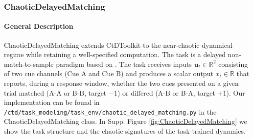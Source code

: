\documentclass{article}
\begin{document}
\clearpage
\subsubsection{ChaoticDelayedMatching \label{appendix:TT-TaskEnvs-Chaotic}}
\paragraph{General Description}
ChaoticDelayedMatching extends CtDToolkit to the near-chaotic dynamical regime while retaining a well-specified computation. The task is a delayed non-match-to-sample paradigm based on \cite{miconi2017biologically}. The task receives inputs $\mathbf{u}_t \in \mathbb{R}^2$ consisting of two cue channels (Cue A and Cue B) and produces a scalar output $x_t \in \mathbb{R}$ that reports, during a response window, whether the two cues presented on a given trial matched (A-A or B-B, target $-1$) or differed (A-B or B-A, target $+1$). Our implementation can be found in \texttt{/ctd/task\_modeling/task\_env/chaotic\_delayed\_matching.py} in the ChaoticDelayedMatching class. In Supp. Figure \ref{fig:ChaoticDelayedMatching} we show the task structure and the chaotic signatures of the task-trained dynamics.
\end{document}
